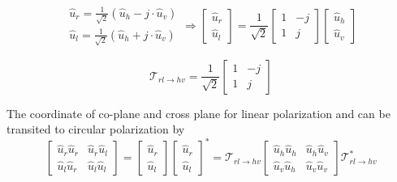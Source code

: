 \documentclass[draftcls,onecolumn]{IEEEtran}  %
\begin{document}
\begin{equation*}
	\begin{matrix}
	\hat{u}_{r} = \frac{1}{\sqrt{2}}(\hat{u}_h - j\cdot \hat{u}_v) \\
	\hat{u}_{l} = \frac{1}{\sqrt{2}}(\hat{u}_h + j\cdot \hat{u}_v)
	\end{matrix}
	\Rightarrow 
	\begin{bmatrix}
	\hat{u}_{r} \\
	\hat{u}_{l}
	\end{bmatrix}= \frac{1}{\sqrt{2}}	 
	\begin{bmatrix}
	1 & -j \\
	1 & j
	\end{bmatrix}	
	\begin{bmatrix}
	\hat{u}_{h} \\
	\hat{u}_{v}
	\end{bmatrix}
\end{equation*}

\begin{equation}
	\mathcal{T}_{rl \rightarrow hv} =  \frac{1}{\sqrt{2}}	
	\begin{bmatrix}
	1 & -j \\
	1 & j
	\end{bmatrix}
\end{equation}

The coordinate of co-plane and cross plane for linear polarization and  can be transited to circular polarization by
\begin{equation}
 	\begin{bmatrix}
	\hat{u}_{r}\hat{u}_{r} & \hat{u}_{r}\hat{u}_{l} \\
	\hat{u}_{l}\hat{u}_{r} & \hat{u}_{l}\hat{u}_{l}
	\end{bmatrix} = 
	\begin{bmatrix}
	\hat{u}_{r} \\
	\hat{u}_{l} 
	\end{bmatrix}
	\begin{bmatrix}
	\hat{u}_{r} \\
	\hat{u}_{l} 
	\end{bmatrix}^* = 
	\mathcal{T}_{rl \rightarrow hv}
	\begin{bmatrix}
	\hat{u}_{h}\hat{u}_{h} & \hat{u}_{h}\hat{u}_{v} \\
	\hat{u}_{v}\hat{u}_{h} & \hat{u}_{v}\hat{u}_{v}
	\end{bmatrix}
	\mathcal{T}_{rl \rightarrow hv}^*
\end{equation}
\end{document}
